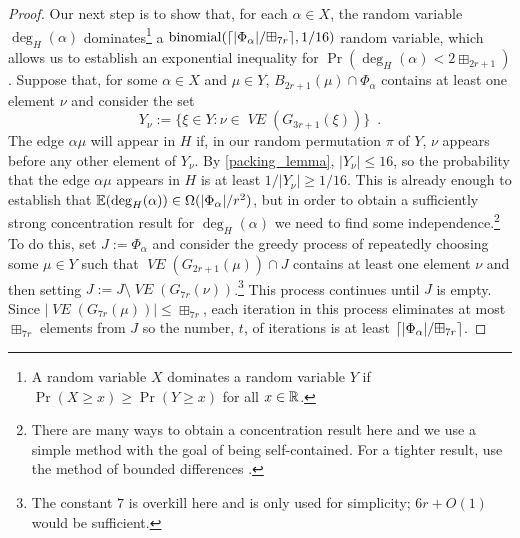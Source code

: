 \documentclass{patmorin}
\newcommand{\vol}[1]{\boxplus_{#1}}
\DeclareMathOperator{\binomial}{binomial}
\DeclareMathOperator{\VE}{\mathit{VE}}
\begin{document}
\begin{proof}
  Our next step is to show that, for each $\alpha\in X$, the random variable $\deg_H(\alpha)$ dominates\footnote{A random variable $X$ dominates a random variable $Y$ if $\Pr(X\ge x)\ge \Pr(Y\ge x)$ for all $x\in\mathbb{R}$.} a $\binomial(\ceil{|\Phi_\alpha|/\vol{7r}},1/16)$ random variable, which allows us to establish an exponential inequality for $\Pr(\deg_H(\alpha) < 2\vol{2r+1})$. Suppose that, for some $\alpha\in X$ and $\mu\in Y$, $B_{2r+1}(\mu)\cap \Phi_\alpha$ contains at least one element $\nu$ and consider the set
  \[
     Y_\nu := \{\xi\in Y:\nu\in\VE(G_{3r+1}(\xi))\} \enspace .
  \]
  The edge $\alpha\mu$ will appear in $H$ if, in our random permutation $\pi$ of $Y$, $\nu$ appears before any other element of $Y_\nu$.  By \cref{packing_lemma}, $|Y_\nu|\le 16$, so the probability that the edge $\alpha\mu$ appears in $H$ is at least $1/|Y_\nu|\ge 1/16$. This is already enough to establish that $\mathbb{E}(\deg_H(\alpha)) \in \Omega(|\Phi_\alpha|/r^2)$, but in order to obtain a sufficiently strong concentration result for $\deg_H(\alpha)$ we need to find some independence.\footnote{There are many ways to obtain a concentration result here and we use a simple method with the goal of being self-contained.  For a tighter result, use the method of bounded differences \cite{mcdiarmid:on}.}  To do this, set $J:=\Phi_\alpha$ and consider the greedy process of repeatedly choosing some $\mu\in Y$ such that $\VE(G_{2r+1}(\mu))\cap J$ contains at least one element $\nu$ and then setting $J:=J\setminus \VE(G_{7r}(\nu))$.\footnote{The constant $7$ is overkill here and is only used for simplicity; $6r+O(1)$ would be sufficient.}  This process continues until $J$ is empty. Since $|\VE(G_{7r}(\mu))|\le \vol{7r}$, each iteration in this process eliminates at most $\vol{7r}$ elements from $J$ so the number, $t$, of iterations is at least $\ceil{|\Phi_\alpha|/\vol{7r}}$.


\end{proof}
\end{document}

